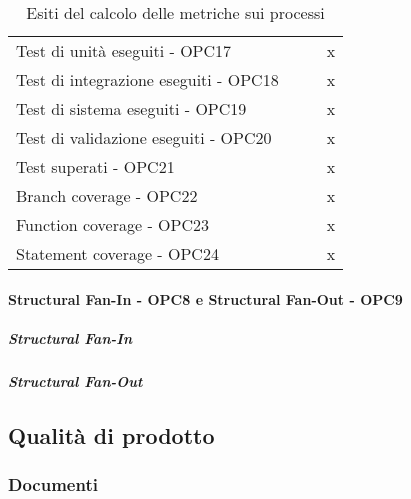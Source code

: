\documentclass[PdQ.tex]{subfiles}
\begin{document}
\begin{table}[h]
\begin{tabular}{l c c c}
					\rule[0cm]{0cm}{0.4cm} 
					Test di unità eseguiti - OPC17 & & & x \\
					\rule[0cm]{0cm}{0.4cm} 
					Test di integrazione eseguiti - OPC18 & & & x \\
					\rule[0cm]{0cm}{0.4cm} 
					Test di sistema eseguiti - OPC19 & & & x \\
					\rule[0cm]{0cm}{0.4cm} 
					Test di validazione eseguiti - OPC20 & & & x \\
					\rule[0cm]{0cm}{0.4cm} 
					Test superati - OPC21 & & & x \\
					\rule[0cm]{0cm}{0.4cm} 
					Branch coverage - OPC22 & & & x \\
					\rule[0cm]{0cm}{0.4cm} 
					Function coverage - OPC23 & & & x \\
					\rule[0cm]{0cm}{0.4cm} 
					Statement coverage - OPC24 & & & x \\
					
					\hline
				\end{tabular}
				\caption{Esiti del calcolo delle metriche sui processi}
			\end{table}
		\newpage
		\paragraph{Structural Fan-In - OPC8 e Structural Fan-Out - OPC9}
		\subparagraph{Structural Fan-In}	
		
		\subparagraph{Structural Fan-Out}
		
		
\newpage		
\subsection{Qualità di prodotto}
	\subsubsection{Documenti}
\end{document}
